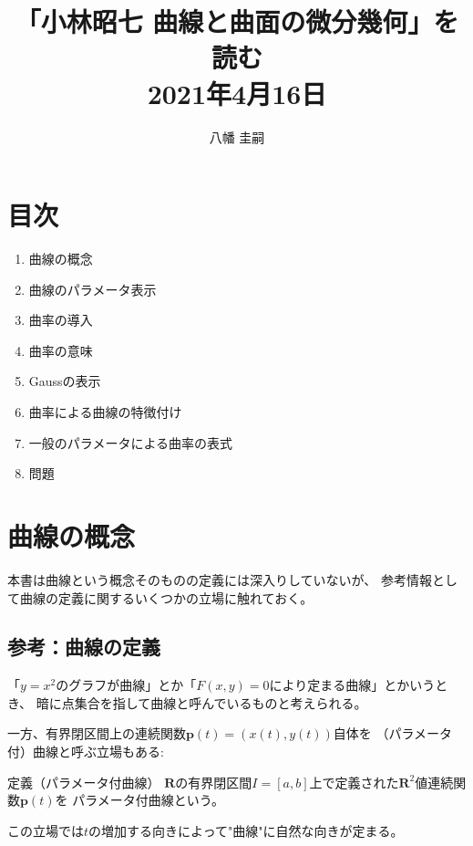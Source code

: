 \documentclass[a4j,disablejfam,dvipdfmx,papersize,slide,uplatex,21pt]{jsarticle}
\begin{document}
\title{「小林昭七 曲線と曲面の微分幾何」を読む\\
2021年4月16日}
\author{八幡 圭嗣}
\date{}
\maketitle

\section*{目次}
\begin{enumerate}
    \item 曲線の概念
    \item 曲線のパラメータ表示
    \item 曲率の導入
    \item 曲率の意味
    \item Gaussの表示
    \item 曲率による曲線の特徴付け
    \item 一般のパラメータによる曲率の表式
    \item 問題
\end{enumerate}



\section{曲線の概念}
本書は曲線という概念そのものの定義には深入りしていないが、
参考情報として曲線の定義に関するいくつかの立場に触れておく。

\newpage
\subsection*{参考：曲線の定義}
「$y=x^2$のグラフが曲線」とか「$F(x,y)=0$により定まる曲線」とかいうとき、
暗に点集合を指して曲線と呼んでいるものと考えられる。

一方、有界閉区間上の連続関数$\bm{p}(t) = (x(t), y(t))$自体を
（パラメータ付）曲線と呼ぶ立場もある\cite{kaiseki1}:

\begin{itembox}[l]{定義（パラメータ付曲線）\footnotemark[1]}
    $\bm{R}$の有界閉区間$I=[a, b]$上で定義された$\bm{R}^2$値連続関数$\bm{p}(t)$を
    パラメータ付曲線という。
\end{itembox}

この立場では$t$の増加する向きによって"曲線"に自然な向きが定まる。

\end{document}
